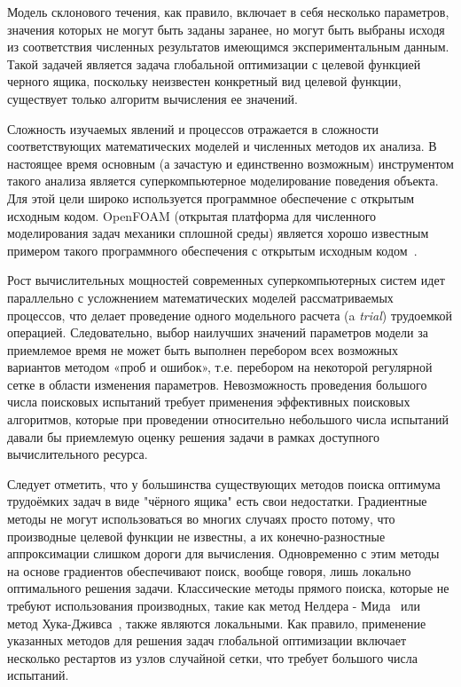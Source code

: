 \documentclass[mathematics,article,accept,pdftex,moreauthors]{Definitions/mdpi}
\begin{document}
Модель склонового течения, как правило, включает в себя несколько параметров, значения которых не могут быть заданы заранее, но могут быть выбраны исходя из соответствия численных результатов имеющимся экспериментальным данным. Такой задачей является задача глобальной оптимизации с целевой функцией черного ящика, поскольку неизвестен конкретный вид целевой функции, существует только алгоритм вычисления ее значений.

Сложность изучаемых явлений и процессов отражается в сложности соответствующих математических моделей и численных методов их анализа. В настоящее время основным (а зачастую и единственно возможным) инструментом такого анализа является суперкомпьютерное моделирование поведения объекта. Для этой цели широко используется программное обеспечение с открытым исходным кодом. OpenFOAM (открытая платформа для численного моделирования задач механики сплошной среды) является хорошо известным примером такого программного обеспечения с открытым исходным кодом~\cite{Weller1998}.


Рост вычислительных мощностей современных суперкомпьютерных систем идет параллельно с усложнением математических моделей рассматриваемых процессов, что делает проведение одного модельного расчета (a \textit{trial}) трудоемкой операцией. Следовательно, выбор наилучших значений параметров модели за приемлемое время не может быть выполнен перебором всех возможных вариантов методом «проб и ошибок», т.е. перебором на некоторой регулярной сетке в области изменения параметров.
Невозможность проведения большого числа поисковых испытаний требует применения эффективных поисковых алгоритмов, которые при проведении относительно небольшого числа испытаний давали бы приемлемую оценку решения задачи в рамках доступного вычислительного ресурса.

Следует отметить, что у большинства существующих методов поиска оптимума трудоёмких задач в виде "чёрного ящика" есть свои недостатки. Градиентные методы не могут использоваться во многих случаях просто потому, что производные целевой функции не известны, а их конечно-разностные аппроксимации слишком дороги для вычисления. Одновременно с этим методы на основе градиентов обеспечивают поиск, вообще говоря, лишь локально оптимального решения задачи.
Классические методы прямого поиска, которые не требуют использования производных, такие как метод Нелдера - Мида~\cite{NelderMead} или метод Хука-Дживса~\cite{HookJeeves}, также являются локальными. Как правило, применение указанных методов для решения задач глобальной оптимизации включает несколько рестартов из узлов случайной сетки, что требует большого числа испытаний. 
\end{document}
